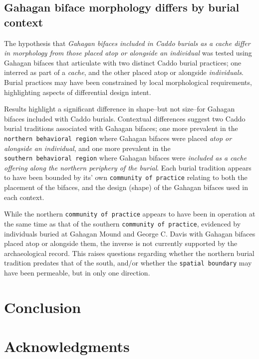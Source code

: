 \documentclass[]{interact}
\theoremstyle{plain}%
\theoremstyle{definition}
\theoremstyle{remark}
\begin{document}
\hypertarget{gahagan-biface-morphology-differs-by-burial-context}{%
\subsection{Gahagan biface morphology differs by burial
context}\label{gahagan-biface-morphology-differs-by-burial-context}}

The hypothesis that \emph{Gahagan bifaces included in Caddo burials as a
cache differ in morphology from those placed atop or alongside an
individual} was tested using Gahagan bifaces that articulate with two
distinct Caddo burial practices; one interred as part of a \emph{cache},
and the other placed atop or alongside \emph{individuals}. Burial
practices may have been constrained by local morphological requirements,
highlighting aspects of differential design intent.

Results highlight a significant difference in shape--but not size--for
Gahagan bifaces included with Caddo burials. Contextual differences
suggest two Caddo burial traditions associated with Gahagan bifaces; one
more prevalent in the \texttt{northern\ behavioral\ region} where
Gahagan bifaces were placed \emph{atop or alongside an individual}, and
one more prevalent in the \texttt{southern\ behavioral\ region} where
Gahagan bifaces were \emph{included as a cache offering along the
northern periphery of the burial}. Each burial tradition appears to have
been bounded by its' own \texttt{community\ of\ practice} relating to
both the placement of the bifaces, and the design (shape) of the Gahagan
bifaces used in each context.

While the northern \texttt{community\ of\ practice} appears to have been
in operation at the same time as that of the southern
\texttt{community\ of\ practice}, evidenced by individuals buried at
Gahagan Mound and George C. Davis with Gahagan bifaces placed atop or
alongside them, the inverse is not currently supported by the
archaeological record. This raises questions regarding whether the
northern burial tradition predates that of the south, and/or whether the
\texttt{spatial\ boundary} may have been permeable, but in only one
direction.

\hypertarget{conclusion}{%
\section{Conclusion}\label{conclusion}}

\hypertarget{acknowledgments}{%
\section*{Acknowledgments}\label{acknowledgments}}
\end{document}
